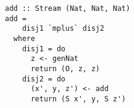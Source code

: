 \begin{figure}[!b]
  \centering
  \begin{minipage}{\columnwidth}
    \begin{lstlisting}[label={add_all}, caption={Function for \lstinline{addo out out out} direction}, captionpos=b, frame=tb]
add :: Stream (Nat, Nat, Nat)
add =
    disj1 `mplus` disj2
  where
    disj1 = do
      z <- genNat
      return (O, z, z)
    disj2 = do
      (x', y, z') <- add
      return (S x', y, S z')
    \end{lstlisting}
  \end{minipage}
\end{figure}